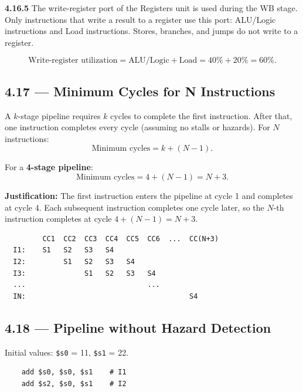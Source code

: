 \medskip\noindent\textbf{4.16.5}
The write-register port of the Registers unit is used during the WB stage.
Only instructions that write a result to a register use this port:
ALU/Logic instructions and Load instructions. Stores, branches, and jumps
do not write to a register.

\[
  \text{Write-register utilization} = \text{ALU/Logic} + \text{Load}
    = 40\% + 20\% = \boxed{60\%.}
\]

\subsection*{4.17 --- Minimum Cycles for N Instructions}
\hypertarget{sol-4.17}{}

A $k$-stage pipeline requires $k$ cycles to complete the first instruction.
After that, one instruction completes every cycle (assuming no stalls or
hazards). For $N$ instructions:
\[
  \text{Minimum cycles} = k + (N - 1).
\]

For a \textbf{4-stage pipeline}:
\[
  \text{Minimum cycles} = 4 + (N - 1) = N + 3.
\]

\noindent\textbf{Justification:} The first instruction enters the pipeline at
cycle 1 and completes at cycle 4. Each subsequent instruction completes one
cycle later, so the $N$-th instruction completes at cycle $4 + (N-1) = N+3$.

\begin{verbatim}
         CC1  CC2  CC3  CC4  CC5  CC6  ...  CC(N+3)
  I1:    S1   S2   S3   S4
  I2:         S1   S2   S3   S4
  I3:              S1   S2   S3   S4
  ...                             ...
  IN:                                       S4
\end{verbatim}

\subsection*{4.18 --- Pipeline without Hazard Detection}
\hypertarget{sol-4.18}{}

Initial values: \texttt{\$s0} = 11, \texttt{\$s1} = 22.

\begin{verbatim}
    add $s0, $s0, $s1    # I1
    add $s2, $s0, $s1    # I2
\end{verbatim}

